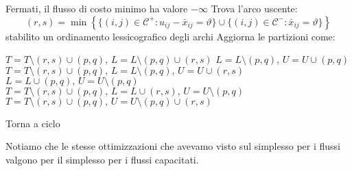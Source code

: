 \documentclass[a4paper,11pt]{article}
\begin{document}
\begin{algorithm}
\begin{algorithmic}
	\IF{$\vartheta = \infty$}
		\STATE Fermati, il flusso di costo minimo ha valore $-\infty$ 
	\ELSE
		\STATE Trova l'arco uscente: 
		$$ 
		(r, s) = \min \left\{ \{(i, j) \in \mathcal{C}^+ : u_{ij} - \bar{x}_{ij} = \vartheta \} \cup \{(i, j) \in \mathcal{C}^- : \bar{x}_{ij} = \vartheta \} \right\} 
		$$
		stabilito un ordinamento lessicografico degli archi
	\ENDIF
	\STATE Aggiorna le partizioni come:
	
			\STATE $ T = T \setminus (r,s) \cup (p,q), \, L = L \setminus (p, q) \cup (r,s) $
		\ELSE
				\STATE $ L = L \setminus (p, q), \, U = U \cup (p, q) $
			\ELSE
				\STATE $ T = T \setminus (r,s) \cup (p,q), \, L = L \setminus (p, q), \, U = U \cup (r, s) $
			\ENDIF
		\ENDIF
	\ELSE
				\STATE $ L = L \cup (p, q), \, U = U \setminus (p, q) $
			\ELSE
				\STATE $ T = T \setminus (r,s) \cup (p,q), \, L = L \cup (r,s), \, U = U \setminus (p,q) $
			\ENDIF
		\ELSE
				\STATE $ T = T \setminus (r,s) \cup (p,q), \, U = U \setminus (p, q) \cup (r,s) $
		\ENDIF
	\ENDIF
	
	\STATE Torna a \textsf{ciclo}
\end{algorithmic}
\end{algorithm}

Notiamo che le stesse ottimizzazioni che avevamo visto sul simplesso per i flussi valgono per il simplesso per i flussi capacitati.
\end{document}
